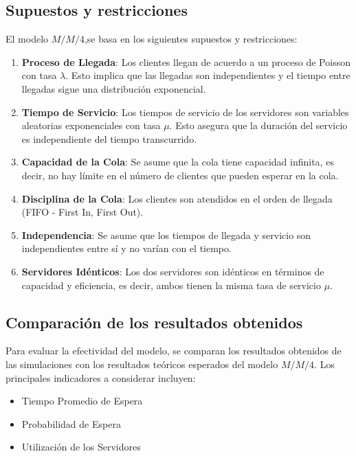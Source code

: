 \documentclass[10pt,twocolumn]{article}
\begin{document}
\subsection{Supuestos y restricciones}

El modelo $M/M/4$,se basa en los siguientes supuestos y restricciones:

\begin{enumerate}
	\item \textbf{Proceso de Llegada}: Los clientes llegan de acuerdo a un proceso de Poisson con tasa $\lambda$. Esto implica que las llegadas son independientes y el tiempo entre llegadas sigue una distribución exponencial.
	\item \textbf{Tiempo de Servicio}: Los tiempos de servicio de los servidores son variables aleatorias exponenciales con tasa $\mu$. Esto asegura que la duración del servicio es independiente del tiempo transcurrido.
	\item \textbf{Capacidad de la Cola}: Se asume que la cola tiene capacidad infinita, es decir, no hay límite en el número de clientes que pueden esperar en la cola.
	\item \textbf{Disciplina de la Cola}: Los clientes son atendidos en el orden de llegada (FIFO - First In, First Out).
	\item \textbf{Independencia}: Se asume que los tiempos de llegada y servicio son independientes entre sí y no varían con el tiempo.
	\item \textbf{Servidores Idénticos}: Los dos servidores son idénticos en términos de capacidad y eficiencia, es decir, ambos tienen la misma tasa de servicio $\mu$.
\end{enumerate}

\subsection{Comparación de los resultados obtenidos}

Para evaluar la efectividad del modelo, se comparan los resultados obtenidos de las simulaciones con los resultados teóricos esperados del modelo $M/M/4$. Los principales indicadores a considerar incluyen:

\begin{itemize}
	\item {Tiempo Promedio de Espera}
	\item {Probabilidad de Espera}
	\item {Utilización de los Servidores}
\end{itemize}
\end{document}
